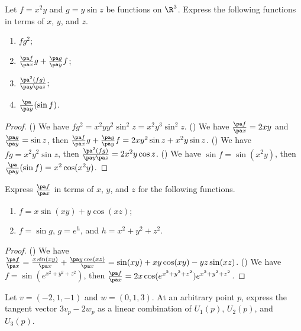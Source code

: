 \newpage
{}
\begin{exercise}[1.1.1]
    Let $f={x}^{2}y$ and $g=y\sin z$ be functions on ${\R}^{3}$. Express the following functions in terms of $x$, $y$, and $z$.
    \begin{enumerate}
        \item $f{g}^{2}$;
        \item $\frac{\pa f}{\pa x}g+\frac{\pa g}{\pa y}f$;
        \item $\frac{{\pa}^{2}(fg)}{\pa y\pa z}$;
        \item $\frac{\pa}{\pa y}(\sin f)$.
    \end{enumerate}
\end{exercise}
\begin{proof}
    () We have $f{g}^{2}={x}^{2}y{y}^{2}{\sin}^{2}z={x}^{2}{y}^{3}{\sin}^{2}z$. () We have $\frac{\pa f}{\pa x}=2xy$ and $\frac{\pa g}{\pa y}=\sin z$, then $\frac{\pa f}{\pa x}g+\frac{\pa g}{\pa y}f=2x{y}^{2}\sin z+{x}^{2}y\sin z$. () We have $fg={x}^{2}{y}^{2}\sin z$, then $\frac{{\pa}^{2}(fg)}{\pa y\pa z}=2{x}^{2}y\cos z$. () We have $\sin f=\sin({x}^{2}y)$, then $\frac{\pa}{\pa y}(\sin f)={x}^{2}\cos({x}^{2}y)$.
\end{proof}
\begin{exercise}[1.1.3]
    Express $\frac{\pa f}{\pa x}$ in terms of $x$, $y$, and $z$ for the following functions.
    \begin{enumerate}
        \item $f=x\sin(xy)+y\cos(xz)$;
        \item $f=\sin g$, $g={e}^{h}$, and $h={x}^{2}+{y}^{2}+{z}^{2}$.
    \end{enumerate}
\end{exercise}
\begin{proof}
    () We have $\frac{\pa f}{\pa x}=\frac{x\sin(xy)}{\pa x}+\frac{\pa y\cos(xz)}{\pa x}=\sin(xy)+xy\cos(xy)-yz\sin(xz)$. () We have $f=\sin({e}^{{x}^{2}+{y}^{2}+{z}^{2}})$, then $\frac{\pa f}{\pa x}=2x\cos({e}^{{x}^{2}+{y}^{2}+{z}^{2}}){e}^{{x}^{2}+{y}^{2}+{z}^{2}}$.
\end{proof}
\begin{exercise}[1.2.1]
    Let $v=(-2,1,-1)$ and $w=(0,1,3)$. At an arbitrary point $p$, express the tangent vector $3{v}_{p}-2{w}_{p}$ as a linear combination of ${U}_{1}(p)$, ${U}_{2}(p)$, and ${U}_{3}(p)$.
\end{exercise}